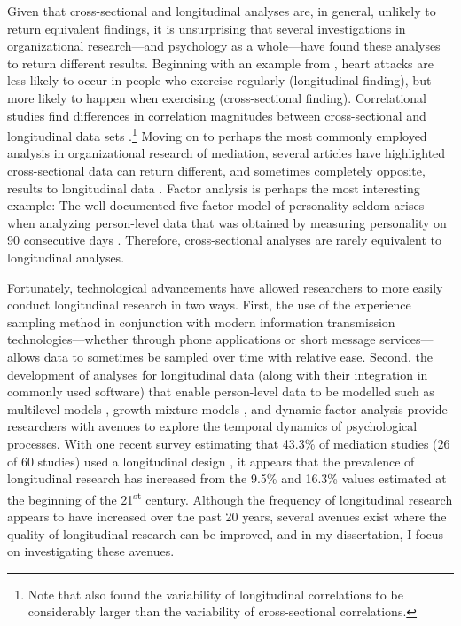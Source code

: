 \documentclass[
12pt, %
twoside,
english]{guelphthesis}
\begin{document}
Given that cross-sectional and longitudinal analyses are, in general, unlikely to return equivalent findings, it is unsurprising that several investigations in organizational research---and psychology as a whole---have found these analyses to return different results. Beginning with an example from \textcite{curran2011}, heart attacks are less likely to occur in people who exercise regularly (longitudinal finding), but more likely to happen when exercising (cross-sectional finding). Correlational studies find differences in correlation magnitudes between cross-sectional and longitudinal data sets \autocites[for a meta-analytic review, see][]{nixon2011,fisher2018}.\footnote{Note that \textcite{fisher2018} also found the variability of longitudinal correlations to be considerably larger than the variability of cross-sectional correlations.} Moving on to perhaps the most commonly employed analysis in organizational research of mediation, several articles have highlighted cross-sectional data can return different, and sometimes completely opposite, results to longitudinal data \autocite{cole2003,maxwell2007,maxwell2011,olaughlin2018}. Factor analysis is perhaps the most interesting example: The well-documented five-factor model of personality seldom arises when analyzing person-level data that was obtained by measuring personality on 90 consecutive days \autocite{hamaker2005}. Therefore, cross-sectional analyses are rarely equivalent to longitudinal analyses.

Fortunately, technological advancements have allowed researchers to more easily conduct longitudinal research in two ways. First, the use of the experience sampling method \autocite{beal2015} in conjunction with modern information transmission technologies---whether through phone applications or short message services---allows data to sometimes be sampled over time with relative ease. Second, the development of analyses for longitudinal data (along with their integration in commonly used software) that enable person-level data to be modelled such as multilevel models \autocite{raudenbush2002}, growth mixture models \autocite{wang2007}, and dynamic factor analysis \autocite{ram2013} provide researchers with avenues to explore the temporal dynamics of psychological processes. With one recent survey estimating that 43.3\% of mediation studies (26 of 60 studies) used a longitudinal design \autocite{olaughlin2018}, it appears that the prevalence of longitudinal research has increased from the 9.5\% \autocite{roe2008} and 16.3\% \autocite{mitchell2013} values estimated at the beginning of the 21\textsuperscript{st} century. Although the frequency of longitudinal research appears to have increased over the past 20 years, several avenues exist where the quality of longitudinal research can be improved, and in my dissertation, I focus on investigating these avenues.
\end{document}
